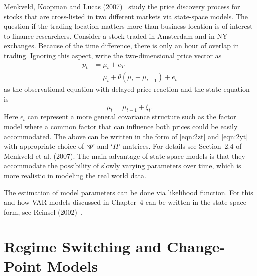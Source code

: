 \begin{ex}
Menkveld, Koopman and Lucas (2007)~\cite{menkkoop} study the price discovery process for stocks that are cross-listed in two different markets via state-space models. The question if the trading location matters more than business location is of interest to finance researchers. Consider a stock traded in Amsterdam and in NY exchanges. Because of the time difference, there is only an hour of overlap in trading. Ignoring this aspect, write the two-dimensional price vector as
	\begin{equation}
	\begin{split}
	p_t&= \mu_t + e_T \\
	&=\mu_t + \theta(\mu_t - \mu_{t-1}) + e_t
	\end{split}
	\end{equation}
as the observational equation with delayed price reaction and the state equation is
	\begin{equation}
	\mu_t= \mu_{t-1} + \xi_t.
	\end{equation}
Here $\epsilon_t$ can represent a more general covariance structure such as the factor model where a common factor that can influence both prices could be easily accommodated. The above can be written in the form of \eqref{eqn:2zt} and \eqref{eqn:2yt} with appropriate choice of `$\Phi$' and `$H$' matrices. For details see Section~2.4 of Menkveld et al. (2007)\cite{menkkoop}. The main advantage of state-space models is that they accommodate the possibility of slowly varying parameters over time, which is more realistic in modeling the real world data. \xqed
\end{ex}


The estimation of model parameters can be done via likelihood function. For this and how VAR models discussed in Chapter~4 can be written in the state-space form, see Reinsel (2002)~\cite{2002reinsel}.



\section{Regime Switching and Change-Point Models}


